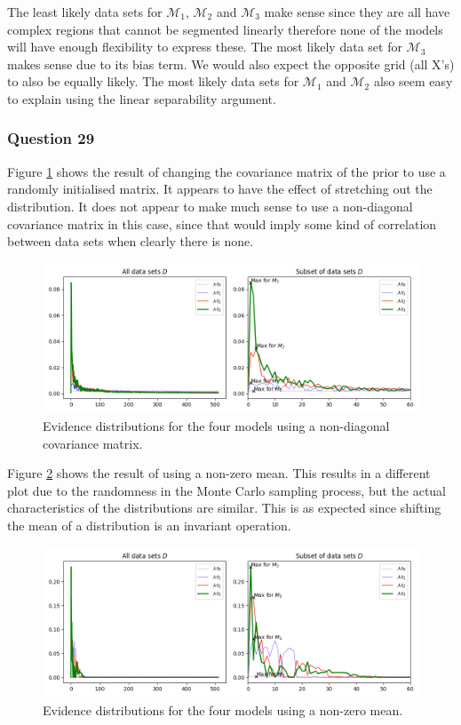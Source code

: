 \documentclass[10pt, a4paper, twocolumn]{article} %
\begin{document}
The least likely data sets for $\mathcal{M}_1$, $\mathcal{M}_2$ and $\mathcal{M}_3$ make sense since they are all have complex regions that cannot be segmented linearly therefore none of the models will have enough flexibility to express these. The most likely data set for $\mathcal{M}_3$ makes sense due to its bias term. We would also expect the opposite grid (all X's) to also be equally likely. The most likely data sets for $\mathcal{M}_1$ and $\mathcal{M}_2$ also seem easy to explain using the linear separability argument. 

\subsubsection*{Question 29}

Figure \ref{fig:q29_a} shows the result of changing the covariance matrix of the prior to use a randomly initialised matrix. It appears to have the effect of stretching out the distribution. It does not appear to make much sense to use a non-diagonal covariance matrix in this case, since that would imply some kind of correlation between data sets when clearly there is none.

\begin{figure}[htb]
\centerline{\includegraphics[width=\linewidth]{q29_a.png}}
\caption{Evidence distributions for the four models using a non-diagonal covariance matrix.}
\label{fig:q29_a}
\end{figure}

Figure \ref{fig:q29_b} shows the result of using a non-zero mean. This results in a different plot due to the randomness in the Monte Carlo sampling process, but the actual characteristics of the distributions are similar. This is as expected since shifting the mean of a distribution is an invariant operation.

\begin{figure}[htb]
\centerline{\includegraphics[width=\linewidth]{q29_b.png}}
\caption{Evidence distributions for the four models using a non-zero mean.}
\label{fig:q29_b}
\end{figure}
\end{document}
